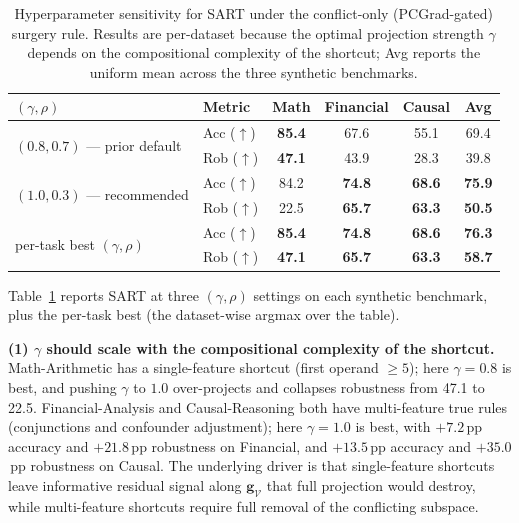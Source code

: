 \begin{table}[h]
\centering
\caption{Hyperparameter sensitivity for SART under the conflict-only (PCGrad-gated) surgery rule. Results are per-dataset because the optimal projection strength $\gamma$ depends on the compositional complexity of the shortcut; Avg reports the uniform mean across the three synthetic benchmarks.}
\label{tab:sensitivity}
\small
\begin{tabular}{llcccc}
\toprule
\textbf{$(\gamma, \rho)$} & \textbf{Metric} & \textbf{Math} & \textbf{Financial} & \textbf{Causal} & \textbf{Avg} \\
\midrule
\multirow{2}{*}{$(0.8, 0.7)$ — prior default}
    & Acc ($\uparrow$) & \textbf{85.4} & 67.6 & 55.1 & 69.4 \\
    & Rob ($\uparrow$) & \textbf{47.1} & 43.9 & 28.3 & 39.8 \\
\midrule
\multirow{2}{*}{$(1.0, 0.3)$ — recommended}
    & Acc ($\uparrow$) & 84.2 & \textbf{74.8} & \textbf{68.6} & \textbf{75.9} \\
    & Rob ($\uparrow$) & 22.5 & \textbf{65.7} & \textbf{63.3} & \textbf{50.5} \\
\midrule
\multirow{2}{*}{per-task best $(\gamma, \rho)$}
    & Acc ($\uparrow$) & \textbf{85.4} & \textbf{74.8} & \textbf{68.6} & \textbf{76.3} \\
    & Rob ($\uparrow$) & \textbf{47.1} & \textbf{65.7} & \textbf{63.3} & \textbf{58.7} \\
\bottomrule
\end{tabular}
\end{table}

Table~\ref{tab:sensitivity} reports SART at three $(\gamma, \rho)$ settings on each synthetic benchmark, plus the per-task best (the dataset-wise argmax over the table).

\textbf{(1) $\gamma$ should scale with the compositional complexity of the shortcut.} Math-Arithmetic has a single-feature shortcut (first operand $\geq 5$); here $\gamma{=}0.8$ is best, and pushing $\gamma$ to $1.0$ over-projects and collapses robustness from 47.1 to 22.5. Financial-Analysis and Causal-Reasoning both have multi-feature true rules (conjunctions and confounder adjustment); here $\gamma{=}1.0$ is best, with $+7.2$\,pp accuracy and $+21.8$\,pp robustness on Financial, and $+13.5$\,pp accuracy and $+35.0$\,pp robustness on Causal. The underlying driver is that single-feature shortcuts leave informative residual signal along $\mathbf{g}_{\mathcal{V}}$ that full projection would destroy, while multi-feature shortcuts require full removal of the conflicting subspace.

